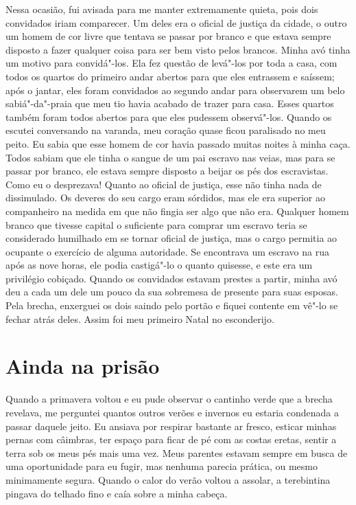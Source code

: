 Nessa ocasião, fui avisada para me
manter extremamente quieta, pois dois convidados iriam comparecer. Um
deles era o oficial de justiça da cidade, o outro um homem de cor livre
que tentava se passar por branco e que estava sempre disposto a fazer
qualquer coisa para ser bem visto pelos brancos. Minha avó tinha um
motivo para convidá"-los. Ela fez questão de levá"-los por toda a casa,
com todos os quartos do primeiro andar abertos para que eles entrassem e
saíssem; após o jantar, eles foram convidados ao segundo andar para
observarem um belo sabiá"-da"-praia que meu tio havia acabado de trazer
para casa. Esses quartos também foram todos abertos para que eles
pudessem observá"-los. Quando os escutei conversando na varanda, meu
coração quase ficou paralisado no meu peito. Eu sabia que esse homem de
cor havia passado muitas noites à minha caça. Todos sabiam que ele tinha
o sangue de um pai escravo nas veias, mas para se passar por branco, ele
estava sempre disposto a beijar os pés dos escravistas. Como eu o
desprezava! Quanto ao oficial de justiça, esse não tinha nada de
dissimulado. Os deveres do seu cargo eram sórdidos, mas ele era superior
ao companheiro na medida em que não fingia ser algo que não era.
Qualquer homem branco que tivesse capital o suficiente para comprar um
escravo teria se considerado humilhado em se tornar oficial de justiça,
mas o cargo permitia ao ocupante o exercício de alguma autoridade. Se
encontrava um escravo na rua após as nove horas, ele podia castigá"-lo o
quanto quisesse, e este era um privilégio cobiçado. Quando os convidados
estavam prestes a partir, minha avó deu a cada um dele um pouco da sua
sobremesa de presente para suas esposas. Pela brecha, enxerguei os dois
saindo pelo portão e fiquei contente em vê"-lo se fechar atrás deles.
Assim foi meu primeiro Natal no esconderijo.

\chapter*{Ainda na prisão}

Quando a primavera voltou e eu pude
observar o cantinho verde que a brecha revelava, me perguntei quantos
outros verões e invernos eu estaria condenada a passar daquele jeito. Eu
ansiava por respirar bastante ar fresco, esticar minhas pernas com
câimbras, ter espaço para ficar de pé com as costas eretas, sentir a
terra sob os meus pés mais uma vez. Meus parentes estavam sempre em
busca de uma oportunidade para eu fugir, mas nenhuma parecia prática, ou
mesmo minimamente segura. Quando o calor do verão voltou a assolar, a
terebintina pingava do telhado fino e caía sobre a minha cabeça.

